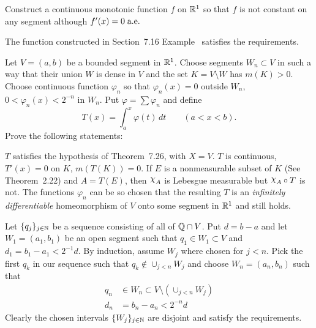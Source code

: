 \begin{enumerate}
\begin{excopy}
Construct a continuous monotonic function $f$ on \(\mathbb{R}^1\) so that $f$ is not
constant on any segment although \(f'(x)=0\;\textrm{a.e.}\)
\end{excopy}

The function constructed in Section~7.16 Example~ satisfies
the requirements.

\begin{excopy}
Let \(V=(a,b)\) be a bounded segment in \(\mathbb{R}^1\).
Choose segments \(W_n\subset V\) in  such a way that their union $W$ is dense 
in $V$ and the set \(K = V \setminus W\) has \(m(K)>0\).
Choose continuous function \(\varphi_n\) so that 
\(\varphi_n(x)=0\) outside \(W_n\), \(0<\varphi_n(x)<2^{-n}\) in \(W_n\).
Put \(\varphi = \sum \varphi_n\) and define
\begin{equation*}
T(x) = \int_a^x \varphi(t)\,dt \qquad (a<x<b).
\end{equation*}
Prove the following statements:
\begin{itemize}
 $T$ satisfies the hypothesis of Theorem~7.26, with \(X=V\).
 $T$ is continuous, \(T'(x)=0\) on $K$, \(m(T(K)) = 0\).
 If $E$ is a nonmeasurable subset of $K$ 
           (See Theorem~2.22) and \(A=T(E)\), then \(\chhi_A\) 
           is Lebesgue measurable but \(\chhi_A \circ T\) is not.
 The functions \(\varphi_n\) can be so chosen that the resulting $T$
           is an \emph{infinitely differentiable} homeomorphism of $V$ onto some
           segment in \(\mathbb{R}^1\) and  still holds.

\end{itemize}
\end{excopy}

Let \(\{q_j\}_{j\in\mathbb{N}}\) be a sequence consisting of all of \(\mathbb{Q}\cap V\).
Put \(d=b-a\) and let \(W_1 = (a_1,b_1)\) be an open segment such that
\(q_1 \in W_1\subset V\) and \(d_1 = b_1 - a_1 < 2^{-1}d\).
By induction, assume \(W_j\) where chosen for \(j<n\).
Pick the first \(q_k\) in our sequence such that 
\(q_k \notin \cup_{j<n} W_j\) and choose \(W_n = (a_n,b_n)\) such that
\begin{align*}
q_n &\in W_n \subset V \setminus \left(\cup_{j<n} W_j\right) \\
d_n &= b_n - a_n < 2^{-n} d
\end{align*}
Clearly the chosen intervals \(\{W_j\}_{j\in\mathbb{N}}\) are disjoint
and satisfy the requirements.


\end{enumerate}
